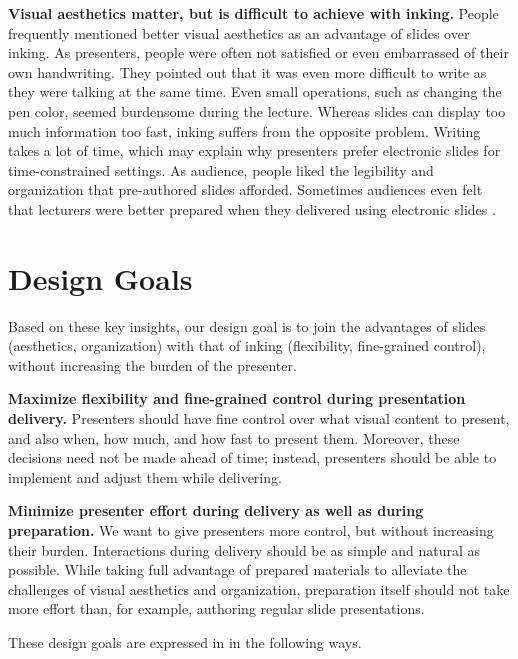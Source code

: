 \textbf{Visual aesthetics matter, but is difficult to achieve with inking.} People frequently mentioned better visual aesthetics as an advantage of slides over inking. As presenters, people were often not satisfied or even embarrassed of their own handwriting. They pointed out that it was even more difficult to write as they were talking at the same time. Even small operations, such as changing the pen color, seemed burdensome during the lecture\cite{anderson2004study}. Whereas slides can display too much information too fast, inking suffers from the opposite problem. Writing takes a lot of time, which may explain why presenters prefer electronic slides for time-constrained settings. As audience, people liked the legibility and organization that pre-authored slides afforded. Sometimes audiences even felt that lecturers were better prepared when they delivered using electronic slides \cite{frey2002learners}.

\section{Design Goals}
Based on these key insights, our design goal is to join the advantages of slides (aesthetics, organization) with that of inking (flexibility, fine-grained control), without increasing the burden of the presenter. 


\textbf{Maximize flexibility and fine-grained control during presentation delivery.} Presenters should have fine control over what visual content to present, and also when, how much, and how fast to present them. Moreover, these decisions need not be made ahead of time; instead, presenters should be able to implement and adjust them while delivering.

\textbf{Minimize presenter effort during delivery as well as during preparation.} We want to give presenters more control, but without increasing their burden. Interactions during delivery should be as simple and natural as possible. While taking full advantage of prepared materials to alleviate the challenges of visual aesthetics and organization, preparation itself should not take more effort than, for example, authoring regular slide presentations. 

These design goals are expressed in \interface in the following ways. 


